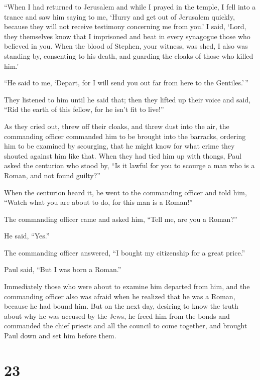  ``When I had returned to Jerusalem and while I prayed in
the temple, I fell into a trance  and saw him saying to
me, `Hurry and get out of Jerusalem quickly, because they will not
receive testimony concerning me from you.'  I said,
`Lord, they themselves know that I imprisoned and beat in every
synagogue those who believed in you.  When the blood of
Stephen, your witness, was shed, I also was standing by, consenting to
his death, and guarding the cloaks of those who killed him.'

 ``He said to me, `Depart, for I will send you out far
from here to the Gentiles.'\,''

 They listened to him until he said that; then they
lifted up their voice and said, ``Rid the earth of this fellow, for he
isn't fit to live!''

 As they cried out, threw off their cloaks, and threw
dust into the air,  the commanding officer commanded him
to be brought into the barracks, ordering him to be examined by
scourging, that he might know for what crime they shouted against him
like that.  When they had tied him up with thongs, Paul
asked the centurion who stood by, ``Is it lawful for you to scourge a
man who is a Roman, and not found guilty?''

 When the centurion heard it, he went to the commanding
officer and told him, ``Watch what you are about to do, for this man is
a Roman!''

 The commanding officer came and asked him, ``Tell me,
are you a Roman?''

He said, ``Yes.''

 The commanding officer answered, ``I bought my
citizenship for a great price.''

Paul said, ``But I was born a Roman.''

 Immediately those who were about to examine him departed
from him, and the commanding officer also was afraid when he realized
that he was a Roman, because he had bound him.  But on
the next day, desiring to know the truth about why he was accused by the
Jews, he freed him from the bonds and commanded the chief priests and
all the council to come together, and brought Paul down and set him
before them.

\hypertarget{section-22}{%
\section{23}\label{section-22}}

